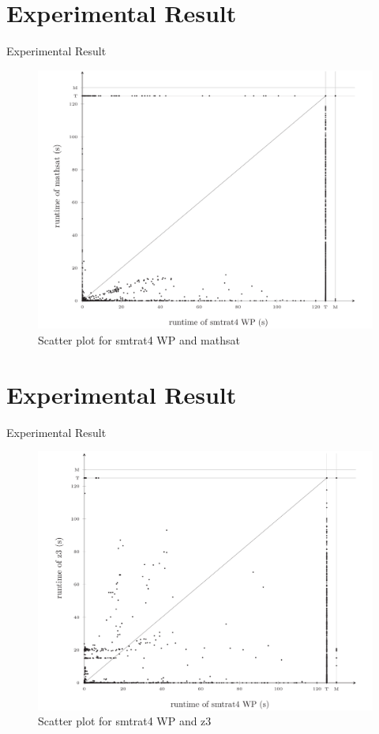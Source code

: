 \documentclass[]{beamer}
\begin{document}
\section{Experimental Result}
\begin{frame}{Experimental Result}
\begin{figure}[!ht]
    \centering
    \caption{Scatter plot for smtrat4 WP and mathsat}
    \includegraphics[width=.75\linewidth]{../figures/scatter-smtrat_4_preprocessing-mathsat.pdf}
\end{figure}
\end{frame}

\section{Experimental Result}
\begin{frame}{Experimental Result}
\begin{figure}[!ht]
    \centering
    \caption{Scatter plot for smtrat4 WP and z3}
    \includegraphics[width=.75\linewidth]{../figures/scatter-smtrat_4_preprocessing-z3.pdf}
\end{figure}
\end{frame}
\end{document}
